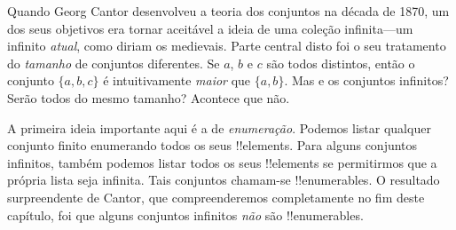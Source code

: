 \documentclass[../../../include/open-logic-section]{subfiles}
\begin{document}


Quando Georg Cantor desenvolveu a teoria dos conjuntos na década de 1870, um dos
seus objetivos era tornar aceitável a ideia de uma coleção infinita---um
infinito \emph{atual}, como diriam os medievais. Parte central disto foi o
seu tratamento do \emph{tamanho} de conjuntos diferentes. Se $a$, $b$ e $c$ são todos distintos, então o conjunto $\{a, b, c\}$ é intuitivamente
\emph{maior} que $\{a, b\}$. Mas e os conjuntos infinitos? Serão todos do mesmo
tamanho? Acontece que não.

A primeira ideia importante aqui é a de \emph{enumeração}. Podemos
listar qualquer conjunto finito enumerando todos os seus !!{element}s. Para
alguns conjuntos infinitos, também podemos listar todos os seus !!{element}s se
permitirmos que a própria lista seja infinita. Tais conjuntos chamam-se
!!{enumerable}s. O resultado surpreendente de Cantor, que compreenderemos
completamente no fim deste capítulo, foi que alguns conjuntos infinitos \emph{não} são
!!{enumerable}s.
\end{document}
